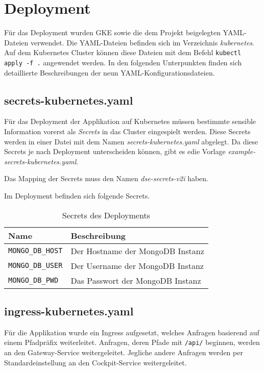 \section{Deployment}

Für das Deployment wurden GKE sowie die dem Projekt beigelegten YAML-Dateien verwendet.
Die YAML-Dateien befinden sich im Verzeichnis \textit{kubernetes}.
Auf dem Kubernetes Cluster können diese Dateien mit dem Befehl \verb|kubectl apply -f .| angewendet werden. 
In den folgenden Unterpunkten finden sich detaillierte Beschreibungen der neun YAML-Konfigurationsdateien.

\subsection{secrets-kubernetes.yaml}

Für das Deployment der Applikation auf Kubernetes müssen bestimmte sensible Information vorerst als \textit{Secrets} in das Cluster eingespielt werden.
Diese Secrets werden in einer Datei mit dem Namen \textit{secrets-kubernetes.yaml} abgelegt.
Da diese Secrets je nach Deployment unterscheiden können, gibt es edie Vorlage \textit{example-secrets-kubernetes.yaml}. 

Das Mapping der Secrets muss den Namen \textit{dse-secrets-v2i} haben.

Im Deployment befinden sich folgende Secrets.

\begin{table}[h]
	\begin{tabular}{|l|l|}
		\hline
		Name & Beschreibung \\ \hline
		\verb|MONGO_DB_HOST| &  Der Hostname der MongoDB Instanz  \\ \hline
		\verb|MONGO_DB_USER| &  Der Username der MongoDB Instanz  \\ \hline
		\verb|MONGO_DB_PWD|  &  Das Passwort der MongoDB Instanz  \\ \hline
	\end{tabular}
	\caption{Secrets des Deployments}
\end{table}

\subsection{ingress-kubernetes.yaml}

Für die Applikation wurde ein Ingress aufgesetzt, welches Anfragen basierend auf einem Pfadpräfix weiterleitet. 
Anfragen, deren Pfade mit \verb|/api/| beginnen, werden an den Gateway-Service weitergeleitet.
Jegliche andere Anfragen werden per Standardeinstellung an den Cockpit-Service weitergeleitet.

